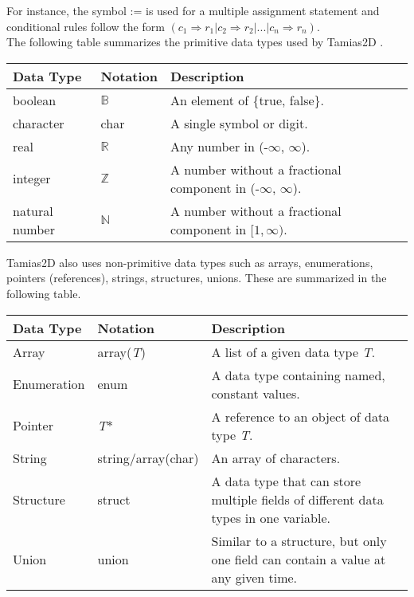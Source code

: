 \documentclass[12pt]{article}
\newcommand{\progname}{Tamias2D }
\begin{document}
For instance, the symbol := is used for a
multiple assignment statement and conditional rules follow the form $(c_1
\Rightarrow r_1 | c_2 \Rightarrow r_2 | ... | c_n \Rightarrow r_n )$.\\

The following table summarizes the primitive data types used by \progname. 


\renewcommand*{\arraystretch}{1.2}
\noindent  \begin{longtable}{l l p{10.5cm}} 
\toprule 
\textbf{Data Type} & \textbf{Notation} & \textbf{Description} \\ 
\midrule
boolean & $\mathbb{B}$ & An element of \{true, false\}. \\
character & char & A single symbol or digit. \\
real & $\mathbb{R}$ & Any number in (-$\infty$, $\infty$). \\
integer & $\mathbb{Z}$ & A number without a fractional
  component in (-$\infty$, $\infty$). \\
natural number & $\mathbb{N}$ & A number without a fractional
  component in $[1, \infty)$. \\
\bottomrule
\end{longtable} 

\noindent \progname also uses non-primitive data types such as arrays, enumerations, pointers (references), strings, structures, unions. These are summarized in the following table.

\renewcommand*{\arraystretch}{1.2}
\noindent \begin{longtable}{l l p{9.5cm}}
\toprule
	\textbf{Data Type} & \textbf{Notation} & \textbf{Description} \\
\midrule
	Array & array(\textit{T}) & A list of a given data type \textit{T}. \\
	Enumeration & enum & A data type containing named, constant values. \\
	Pointer & \textit{T}* & A reference to an object of data type \textit{T}. \\
	String & string/array(char) & An array of characters. \\
	Structure & struct & A data type that can store multiple fields of different data types in one variable. \\
	Union & union & Similar to a structure, but only one field can contain a value at any given time. \\
	\bottomrule
\end{longtable}
\end{document}
